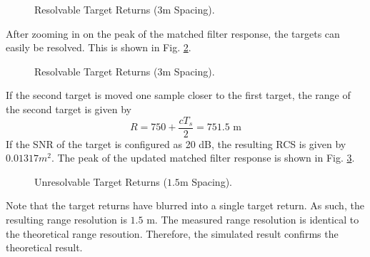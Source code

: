 \documentclass[conference]{IEEEtran}
\begin{document}
\begin{figure}[H]
\centerline{}
\caption{Resolvable Target Returns ($3$m Spacing).}
\label{resolvable_full}
\end{figure}
\noindent
After zooming in on the peak of the matched filter response, the targets can easily be resolved. This is shown in Fig. \ref{resolvable_peak}.
\begin{figure}[H]
\centerline{}
\caption{Resolvable Target Returns ($3$m Spacing).}
\label{resolvable_peak}
\end{figure}
\par
If the second target is moved one sample closer to the first target, the range of the second target is given by 
\begin{equation}
R = 750 + \frac{cT_s}{2} = 751.5 \text{ m}
\end{equation}
If the SNR of the target is configured as 20 dB, the resulting RCS is given by $0.01317m^2$. The peak of the updated matched filter response is shown in Fig. \ref{unresolvable_peak}.
\begin{figure}[H]
\centerline{}
\caption{Unresolvable Target Returns ($1.5$m Spacing).}
\label{unresolvable_peak}
\end{figure}
\par
Note that the target returns have blurred into a single target return. As such, the resulting range resolution is $1.5 \text{ m}$. The measured range resolution is identical to the theoretical range resoution. Therefore, the simulated result confirms the theoretical result.
\end{document}
